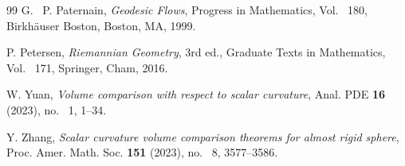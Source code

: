 \documentclass[11pt, reqno]{amsart}
\begin{document}
\begin{thebibliography}{99}
G. ~P. Paternain,
\emph{Geodesic Flows},
Progress in Mathematics, Vol. ~180, Birkh\"auser Boston, Boston, MA, 1999.

P. Petersen,
\emph{Riemannian Geometry}, 3rd ed.,
Graduate Texts in Mathematics, Vol. ~171, Springer, Cham, 2016.

W. Yuan,
\emph{Volume comparison with respect to scalar curvature},
Anal. PDE \textbf{16} (2023), no. ~1, 1--34.

Y. Zhang,
\emph{Scalar curvature volume comparison theorems for almost rigid sphere},
Proc. Amer. Math. Soc. \textbf{151} (2023), no. ~8, 3577--3586.

\end{thebibliography}
\end{document}

